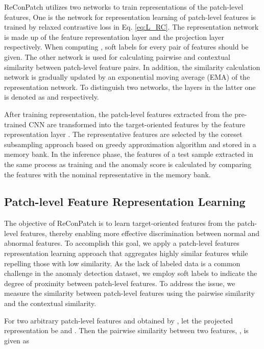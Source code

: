 \documentclass[10pt,onecolumn,letterpaper]{article}
\begin{document}
ReConPatch utilizes two networks to train representations of the patch-level features,
One is the network for representation learning of patch-level features is trained by relaxed contrastive loss  in Eq. \ref{eq:L_RC}.
The representation network is made up of the feature representation layer  and the projection layer  respectively. 
When computing , soft labels for every pair of features should be given.
The other network is used for calculating pairwise and contextual similarity between patch-level feature pairs.
In addition, the similarity calculation network is gradually updated by an exponential moving average (EMA) of the representation network. To distinguish two networks, the layers in the latter one is denoted as  and  respectively.


After training representation, the patch-level features extracted from the pre-trained CNN are transformed into the target-oriented features by the feature representation layer  \cite{chen2020simple}.
The representative features are selected by the coreset subsampling approach based on greedy approximation algorithm \cite{sinha2020gan} and stored in a memory bank. 
In the inference phase, the features of a test sample extracted in the same process as training and the anomaly score is calculated by comparing the features with the nominal representative in the memory bank.

\subsection{Patch-level Feature Representation Learning} \label{sec3.2}
The objective of ReConPatch is to learn target-oriented features from the patch-level features, thereby enabling more effective discrimination between normal and abnormal features.
To accomplish this goal, we apply a patch-level features representation learning approach that aggregates highly similar features while repelling those with low similarity.
As the lack of labeled data is a common challenge in the anomaly detection dataset, we employ soft labels to indicate the degree of proximity between patch-level features.
To address the issue, we measure the similarity between patch-level features using the pairwise similarity and the contextual similarity.

For two arbitrary patch-level features  and  obtained by , 
let the projected representation be  and .
Then the pairwise similarity between two features, , is given as
 
\end{document}
